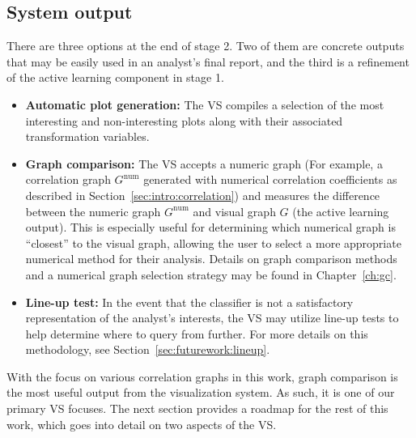 \subsection{System output}
\label{sec:visualizer:plotgeneration:output}

There are three options at the end of stage 2. Two of them are concrete outputs 
that may be easily used in an analyst's final report, and the third is a 
refinement of the active learning component in stage 1.

\tablespacing
\begin{itemize}
	\item \textbf{Automatic plot generation:} The VS compiles a selection of 
	the most interesting and non-interesting plots along with their 
	associated transformation variables.
	\item \textbf{Graph comparison:} The VS accepts a numeric graph (For 
	example, a correlation graph $G^{\text{num}}$ generated with numerical 
	correlation 
	coefficients as described in Section~\ref{sec:intro:correlation}) and 
	measures the difference between the numeric graph $G^{\text{num}}$ and 
	visual graph $G$ (the active learning output). This is especially useful 
	for determining which numerical graph is ``closest'' to the visual graph, 
	allowing the user to select a more appropriate numerical method for their 
	analysis. Details on graph comparison methods and a numerical graph 
	selection strategy may be found in Chapter~\ref{ch:gc}.
	\item \textbf{Line-up test:} In the event that the classifier is not a 
	satisfactory representation of the analyst's interests, the VS may utilize 
	line-up tests to help determine where to query from further. For more 
	details on this methodology, see Section~\ref{sec:futurework:lineup}.
\end{itemize}
\bodyspacing

With the focus on various correlation graphs in this work, graph comparison is 
the most useful output from the visualization system. As such, it is one of our 
primary VS focuses. The next section provides a roadmap for the rest of this 
work, which goes into detail on two aspects of the VS. 